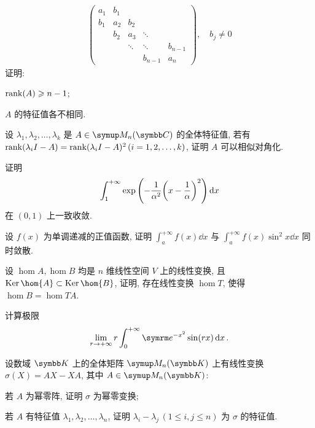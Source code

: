\documentclass{ctexart}
\begin{document}
\begin{exercise}[resume=exer]
\begin{align*}
\begin{pmatrix}
                a_{1} & b_{1} & & & \\
                b_{1} & a_{2} & b_{2} & & \\
                & b_{2} & a_{3} & \ddots & \\
                & & \ddots & \ddots & b_{n-1} \\
                & & & b_{n-1} & a_{n}
            \end{pmatrix},\quad b_{j} \ne 0
        \end{align*}
        证明: 
        \begin{exercise}
            \item $ \rank(A) \geqslant n-1 $;
            \item $ A $ 的特征值各不相同. 
        \end{exercise}
        \item 设 $ \lambda_{1}, \lambda_{2}, \dots, \lambda_{k} $ 是 $ A\in \MM[\C] $ 的全体特征值, 若有 $ \rank(\lambda_{i}I - A) = \rank(\lambda_{i}I - A)^{2}\,(i = 1, 2, \dots, k) $, 证明 $ A $ 可以相似对角化.
        \item 证明
        \begin{align*}
            \int_{1}^{+\infty}\exp\qty(-\frac{1}{\alpha^{2}}\qty(x-\frac{1}{\alpha})^{2}) \dd{x}
        \end{align*}
        在 $ (0, 1) $ 上一致收敛.
        \item 设 $ f(x) $ 为单调递减的正值函数, 证明 $ \int_{a}^{+\infty} f(x) \dd{x} $ 与 $ \int_{a}^{+\infty} f(x)\sin^{2}{x} \dd{x} $ 同时敛散. 
        \item 设 $ \hom{A}, \hom{B} $ 均是 $ n $ 维线性空间 $ V $ 上的线性变换, 且 $ \Ker \hom{A} \subset \Ker \hom{B} $, 证明, 存在线性变换 $ \hom{T} $, 使得 $ \hom{B} = \hom{TA} $.
        \item 计算极限
        \begin{align*}
            \limit{r}{+\infty} r\int_{0}^{+\infty} \me^{-x^{2}}\sin(rx) \dd{x}.
        \end{align*}
        \item 设数域 $ \K $ 上的全体矩阵 $ \MM[\K] $ 上有线性变换 $ \sigma(X) = AX - XA $, 其中 $ A \in \MM[\K] $:
        \begin{exercise}
            \item 若 $ A $ 为幂零阵, 证明 $ \sigma $ 为幂零变换;
            \item 若 $ A $ 有特征值 $ \lambda_{1}, \lambda_{2}, \dots, \lambda_{n} $, 证明 $ \lambda_{i} - \lambda_{j}\,(1\le i, j\le n) $ 为 $ \sigma $ 的特征值.

\end{exercise}
\end{exercise}
\end{document}

